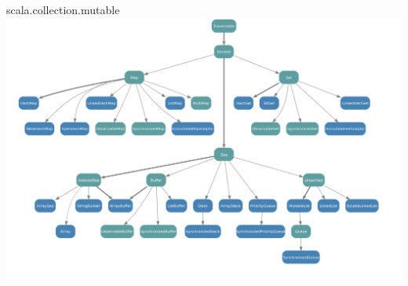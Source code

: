\begin{Slide}{scala.collection.mutable}
\includegraphics[width=1.05\textwidth]{../img/collection/collection-mutable}
\end{Slide}
\fi





